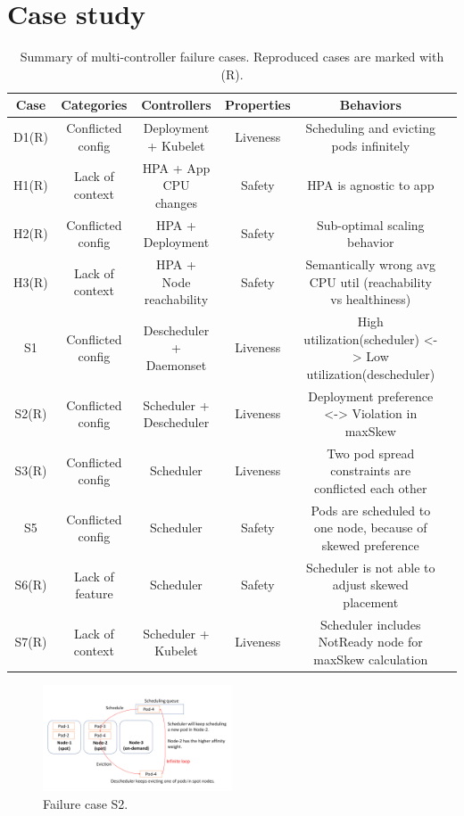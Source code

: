 \section{Case study}
\label{sec:case_study}

\begin{table}[t]
    \centering
    \begin{tabular}{c c c c c c}
    \hline
        Case & Categories & Controllers & Properties & Behaviors  \\ 
        \hline
        D1(R) & Conflicted config & Deployment + Kubelet & Liveness & Scheduling and evicting pods infinitely  \\ 
        H1(R) & Lack of context & HPA + App CPU changes & Safety & HPA is agnostic to app  \\ 
        H2(R) & Conflicted config & HPA + Deployment & Safety & Sub-optimal scaling behavior  \\ 
        H3(R) & Lack of context & HPA + Node reachability & Safety & Semantically wrong avg CPU util (reachability vs healthiness)  \\ 
        S1 & Conflicted config & Descheduler + Daemonset & Liveness & High utilization(scheduler) <-> Low utilization(descheduler) \\ 
        S2(R) & Conflicted config & Scheduler + Descheduler & Liveness & Deployment preference <-> Violation in maxSkew \\ 
        S3(R) & Conflicted config & Scheduler & Liveness & Two pod spread constraints are conflicted each other  \\ 
        S5 & Conflicted config & Scheduler & Safety & Pods are scheduled to one node, because of skewed preference  \\ 
        S6(R) & Lack of feature & Scheduler & Safety & Scheduler is not able to adjust skewed placement  \\ 
        S7(R) & Lack of context & Scheduler + Kubelet & Liveness & Scheduler includes NotReady node for maxSkew calculation  \\ 
        \hline
    \end{tabular}
    \caption{Summary of multi-controller failure cases. Reproduced cases are marked with (R).}
    \label{table:summary}
\end{table}


\begin{figure}[h]
    \centering
    \includegraphics[width=0.5\textwidth]{figure/failure-case-S2.pdf}
    \caption{Failure case S2.}
    \label{fig:s2}
\end{figure}

